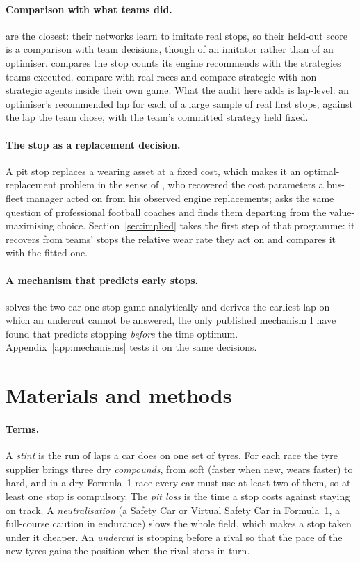 \documentclass[11pt,a4paper]{article}
\begin{document}
\paragraph{Comparison with what teams did.} \citet{heilmeier2020nn} are the
closest: their networks learn to imitate real stops, so their held-out score is
a comparison with team decisions, though of an imitator rather than of an
optimiser. \citet{santillana2026} compares the stop counts its engine recommends
with the strategies teams executed. \citet{bekker2009} compare with real races
and \citet{aguad2024} compare strategic with non-strategic agents inside their
own game. What the audit here adds is lap-level: an optimiser's recommended lap
for each of a large sample of real first stops, against the lap the team chose,
with the team's committed strategy held fixed.

\paragraph{The stop as a replacement decision.} A pit stop replaces a wearing
asset at a fixed cost, which makes it an optimal-replacement problem in the
sense of \citet{rust1987}, who recovered the cost parameters a bus-fleet
manager acted on from his observed engine replacements; \citet{romer2006} asks
the same question of professional football coaches and finds them departing
from the value-maximising choice. Section~\ref{sec:implied} takes the first
step of that programme: it recovers from teams' stops the relative wear rate
they act on and compares it with the fitted one.

\paragraph{A mechanism that predicts early stops.} \citet{salminen2026} solves
the two-car one-stop game analytically and derives the earliest lap on which an
undercut cannot be answered, the only published mechanism I have found that
predicts stopping \emph{before} the time optimum.
Appendix~\ref{app:mechanisms} tests it on the same decisions.

\section{Materials and methods}

\paragraph{Terms.} A \emph{stint} is the run of laps a car does on one set of
tyres. For each race the tyre supplier brings three dry
\emph{compounds}, from soft (faster when new, wears faster) to hard, and in a dry
Formula~1 race every car must use at least two of them, so at least one stop is
compulsory. The \emph{pit loss} is the time a stop costs against staying on
track. A \emph{neutralisation} (a Safety Car or Virtual Safety Car in Formula~1,
a full-course caution in endurance) slows the whole field, which makes a stop
taken under it cheaper. An \emph{undercut} is stopping before a rival so that the
pace of the new tyres gains the position when the rival stops in turn.
\end{document}
